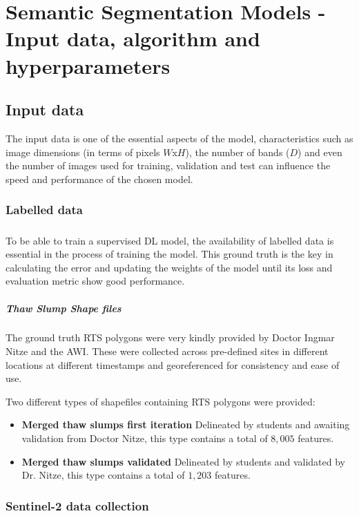 \chapter{Semantic Segmentation Models - Input data, algorithm and hyperparameters} \label{input_data_section}
\section{Input data} \label{input_data_sec}
The input data is one of the essential aspects of the model, characteristics such as image dimensions (in terms of pixels $W$x$H$), the number of bands ($D$) and even the number of images used for training, validation and test can influence the speed and performance of the chosen model.
\subsection{Labelled data} \label{labeled_data}
\paragraph{}
To be able to train a supervised \gls{DL} model, the availability of labelled data is essential in the process of training the model. This ground truth is the key in calculating the error and updating the weights of the model until its loss and evaluation metric show good performance.
\paragraph{Thaw Slump Shape files}
The ground truth \gls{RTS} polygons were very kindly provided by Doctor Ingmar Nitze and the \gls{AWI}. These were collected across pre-defined sites in different locations at different timestamps and georeferenced for consistency and ease of use.

Two different types of shapefiles containing \gls{RTS} polygons were provided:
\begin{itemize}
    \item \textbf{Merged thaw slumps first iteration} Delineated by students and awaiting validation from Doctor Nitze, this type contains a total of $8,005$ features.
    \item \textbf{Merged thaw slumps validated} Delineated by students and validated by Dr. Nitze, this type contains a total of $1,203$ features.
\end{itemize}
\subsection{Sentinel-2 data collection} \label{rs_data_collection}
